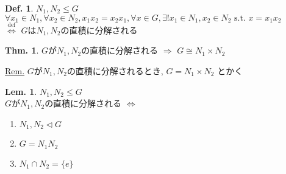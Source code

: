\documentclass[uplatex,dvipdfmx,9pt]{beamer}
\newcommand{\defarrow}{\overset{\mathrm{def}}{\Leftrightarrow}}
\newcommand{\nsubgroup}{\vartriangleleft} %
\newcommand{\st}{\text{ s.t. }}
\newcounter{textLemCount}
\theoremstyle{definition} %
\newtheorem{defn}{Def.}[subsection] %
\newtheorem{thm}{Thm.}[subsection] %
\newtheorem{lemText}[textLemCount]{Lem.} %
\theoremstyle{example}
\begin{document}
      \begin{frame}

        \begin{defn}
          $N_1, N_2 \le G$ \\
          $\forall x_1 \in N_1, \forall x_2 \in N_2, x_1x_2 = x_2x_1, \forall x \in G, \exists! x_1 \in N_1, x_2 \in N_2 \st x = x_1x_2 $ \\
          $\defarrow$ $G$は$N_1, N_2$の\alert{直積に分解される}
        \end{defn}

        \begin{thm}
          $G$が$N_1, N_2$の直積に分解される $\Rightarrow$ $G \cong  N_1 \times N_2$
        \end{thm}
        \underline{Rem.} $G$が$N_1, N_2$の直積に分解されるとき, $G = N_1 \times N_2$ とかく 

        \begin{lemText}
          $N_1, N_2 \le G$ \\
          $G$が$N_1, N_2$の直積に分解される $\Leftrightarrow$
          \begin{enumerate}
            \item $N_1, N_2 \nsubgroup G$
            \item $G = N_1N_2$
            \item $N_1 \cap N_2 = \{e\}$
          \end{enumerate}
          
        \end{lemText}
        
      \end{frame}
\end{document}
